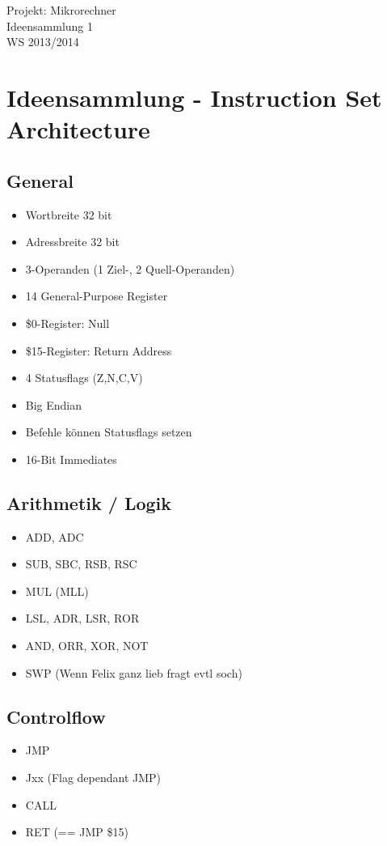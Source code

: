 \documentclass[a4paper]{article}
\newcommand{\titelblock}{
\sloppy
\begin{center}
\sffamily
{\Large{\veranstaltung \\}}
{\Huge{\doctitle  \nummer}\\}
\vspace{0.5cm}
\tutorium \\
\hrulefill
\end{center}
}
\newcommand{\doctitle}{Ideensammlung}
\newcommand{\nummer}{ 1} %
\newcommand{\tutorium}{WS 2013/2014}
\newcommand{\veranstaltung}{Projekt: Mikrorechner}
\begin{document}
\titelblock

\section{Ideensammlung - Instruction Set Architecture}

\subsection{General}

\begin{multicols}{2}
\begin{itemize}

\item Wortbreite 32 bit
\item Adressbreite 32 bit
\item 3-Operanden (1 Ziel-, 2 Quell-Operanden)
\item 14 General-Purpose Register
\item \$0-Register: Null
\item \$15-Register: Return Address
\item 4 Statusflags (Z,N,C,V)
\item Big Endian
\item Befehle können Statusflags setzen
\item 16-Bit Immediates

\end{itemize}

\subsection{Arithmetik / Logik}

\begin{itemize}
\item ADD, ADC
\item SUB, SBC, RSB, RSC
\item MUL (MLL)
\item LSL, ADR, LSR, ROR 
\item AND, ORR, XOR, NOT
\item SWP (Wenn Felix ganz lieb fragt evtl soch)
\end{itemize}

\subsection{Controlflow}

\begin{itemize}
\item JMP
\item Jxx (Flag dependant JMP)
\item CALL
\item RET (== JMP \$15)
\end{itemize}


\end{multicols}
\end{document}
